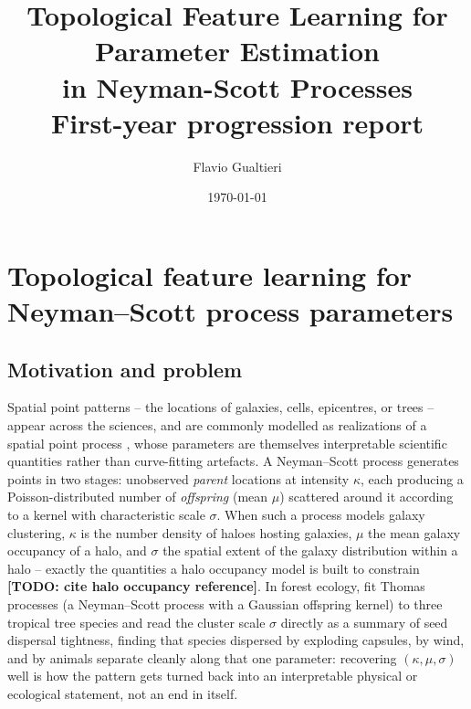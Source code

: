 \documentclass[11pt,a4paper]{article}
\title{Topological Feature Learning for Parameter Estimation\\
       in Neyman-Scott Processes\\[4pt]
       \large First-year progression report}
\author{Flavio Gualtieri}
\date{\today}
\theoremstyle{definitioncolon}
\providecommand{\pmTodo}[1]{\textbf{[TODO: #1]}}
\begin{document}
\maketitle


\section{Topological feature learning for Neyman--Scott process parameters}
\label{sec:paramnet}

\subsection{Motivation and problem}
\label{paramnet:sec-motivation}

Spatial point patterns -- the locations of galaxies, cells, epicentres, or
trees -- appear across the sciences, and are commonly modelled as
realizations of a spatial point process \citep{moller2004statistical}, whose
parameters are themselves interpretable scientific quantities rather than
curve-fitting artefacts. A Neyman--Scott process generates points in two
stages: unobserved \emph{parent}
locations at intensity $\kappa$, each producing a Poisson-distributed number
of \emph{offspring} (mean $\mu$) scattered around it according to a kernel
with characteristic scale $\sigma$. When such a process models galaxy
clustering, $\kappa$ is the number density of haloes hosting galaxies,
$\mu$ the mean galaxy occupancy of a halo, and $\sigma$ the spatial extent
of the galaxy distribution within a halo -- exactly the quantities a halo
occupancy model is built to constrain \pmTodo{cite halo occupancy
reference}. In forest ecology, \citet{waagepetersen2009twostep} fit Thomas
processes (a Neyman--Scott process with a Gaussian offspring kernel) to
three tropical tree species and read the cluster scale $\sigma$ directly as
a summary of seed dispersal tightness, finding that species dispersed by
exploding capsules, by wind, and by animals separate cleanly along that one
parameter: recovering $(\kappa,\mu,\sigma)$ well is how the pattern gets
turned back into an interpretable physical or ecological statement, not an
end in itself.
\end{document}
